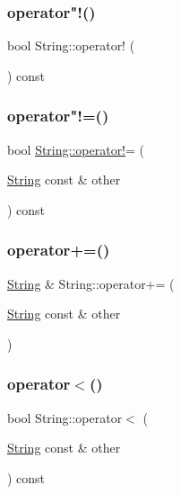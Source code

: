 \mbox{\label{classString_a3a8304a7fe06a23f1750629a9186d346}} 
\subsubsection{\texorpdfstring{operator"!()}{operator!()}}
{\footnotesize\ttfamily bool String\+::operator! (\begin{DoxyParamCaption}{ }\end{DoxyParamCaption}) const}

\mbox{\label{classString_abfb25af8317420d71b0d54603d049383}} 
\subsubsection{\texorpdfstring{operator"!=()}{operator!=()}}
{\footnotesize\ttfamily bool \hyperlink{classString_a3a8304a7fe06a23f1750629a9186d346}{String\+::operator!}= (\begin{DoxyParamCaption}\item[{\hyperlink{classString}{String} const \&}]{other }\end{DoxyParamCaption}) const}

\mbox{\label{classString_acdfa6ad1771ff7c9f9a9dacc177e6661}} 
\subsubsection{\texorpdfstring{operator+=()}{operator+=()}}
{\footnotesize\ttfamily \hyperlink{classString}{String} \& String\+::operator+= (\begin{DoxyParamCaption}\item[{\hyperlink{classString}{String} const \&}]{other }\end{DoxyParamCaption})}

\mbox{\label{classString_a223bf46daeb4d9b4a7000feea4d7a6b3}} 
\subsubsection{\texorpdfstring{operator$<$()}{operator<()}}
{\footnotesize\ttfamily bool String\+::operator$<$ (\begin{DoxyParamCaption}\item[{\hyperlink{classString}{String} const \&}]{other }\end{DoxyParamCaption}) const}

